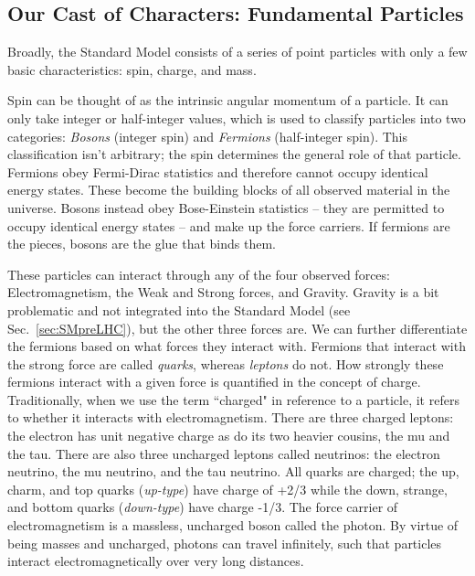 \subsection{Our Cast of Characters: Fundamental Particles}
\label{sec:FundParticles}

Broadly, the Standard Model consists of a series of point particles with only a few basic characteristics: spin, charge, and mass.

Spin can be thought of as the intrinsic angular momentum of a particle. It can only take integer or half-integer values, which is used to classify particles into two categories: \textit{Bosons} (integer spin) and \textit{Fermions} (half-integer spin). This classification isn't arbitrary; the spin determines the general role of that particle. Fermions obey Fermi-Dirac statistics and therefore cannot occupy identical energy states. These become the building blocks of all observed material in the universe. Bosons instead obey Bose-Einstein statistics -- they are permitted to occupy identical energy states -- and make up the force carriers. If fermions are the pieces, bosons are the glue that binds them.

These particles can interact through any of the four observed forces: Electromagnetism, the Weak and Strong forces, and Gravity. Gravity is a bit problematic and not integrated into the Standard Model (see Sec.~\ref{sec:SMpreLHC}), but the other three forces are. We can further differentiate the fermions based on what forces they interact with. Fermions that interact with the strong force are called \textit{quarks}, whereas \textit{leptons} do not. How strongly these fermions interact with a given force is quantified in the concept of charge. Traditionally, when we use the term ``charged" in reference to a particle, it refers to whether it interacts with electromagnetism. There are three charged leptons: the electron has unit negative charge as do its two heavier cousins, the mu and the tau. There are also three uncharged leptons called neutrinos: the electron neutrino, the mu neutrino, and the tau neutrino. All quarks are charged; the up, charm, and top quarks (\textit{up-type}) have charge of +2/3 while the down, strange, and bottom quarks (\textit{down-type}) have charge -1/3. The force carrier of electromagnetism is a massless, uncharged boson called the photon. By virtue of being masses and uncharged, photons can travel infinitely, such that particles interact electromagnetically over very long distances.

